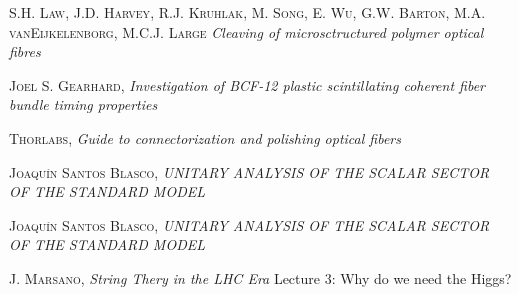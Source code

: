 \begin{thebibliography}{99}
 \textsc{S.H. Law}, \textsc{J.D. Harvey}, \textsc{R.J. Kruhlak}, \textsc{M. Song}, \textsc{E. Wu}, \textsc{G.W. Barton}, \textsc{M.A. vanEijkelenborg}, \textsc{M.C.J. Large}
\textit{Cleaving of microsctructured polymer optical fibres}

 \textsc{Joel S. Gearhard},
\textit{Investigation of BCF-12 plastic scintillating coherent fiber bundle timing properties}

 \textsc{Thorlabs},
\textit{Guide to connectorization and polishing optical fibers}

 \textsc{Joaquín Santos Blasco},
\textit{UNITARY ANALYSIS OF THE SCALAR SECTOR OF THE STANDARD MODEL}

 \textsc{Joaquín Santos Blasco},
\textit{UNITARY ANALYSIS OF THE SCALAR SECTOR OF THE STANDARD MODEL}

 \textsc{J. Marsano},
\textit{String Thery in the LHC Era} Lecture 3: Why do we need the Higgs? 
\end{thebibliography}